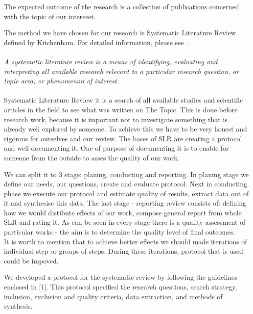 \documentclass[times, 10pt,twocolumn]{article}
\begin{document}
The expected outcome of the research is a collection of publications concerned with the topic of our intereset.
 

The method we have chosen for our research is Systematic Literature Review defined by Kitchenham. For detailed information, please see \cite{kitchenham}. 
~\\
~\\
\emph {A systematic literature review is a means of identifying, evaluating and interpreting all available research relevant to a particular 
research question, or topic area, or phenomenon of interest.} \cite[p.~3]{kitchenham}
~\\
~\\
Systematic Literature Review it is a search of all available studies and scientific articles in the field to see what was written on The Topic. 
This is done before research work, because it is important not to investigate something that is already well explored by someone. To achieve this 
we have to be very honest and rigorous for ourselves and our review. The bases of SLR are creating a protocol and well documenting it. One of 
purpose of documenting it is to enable for someone from the outside to asses the quality of our work. 

We can split it to 3 stage: planing, conducting and reporting. In planing stage we define our needs, our questions, create and evaluate 
protocol. Next in conducting phase we execute our protocol and estimate quality of results, extract data out of it and synthesise this 
data. The last stage - reporting review consists of: defining how we would distibute effects of our work, compose general report from whole 
SLR and rating it. As can be seen in every stage there is a quality assessment of particular works - the aim is to determine the quality level of final outcomes.
~\\
It is worth to mention that to achieve better effects we should made iterations of individual step or groups of steps. During these iterations, protocol that is used could be impoved.


We developed a protocol for the systematic review by following the guidelines enclosed in [1]. This protocol specified the research questions, search
strategy, inclusion, exclusion and quality criteria, data extraction, and methods of synthesis.
\end{document}
